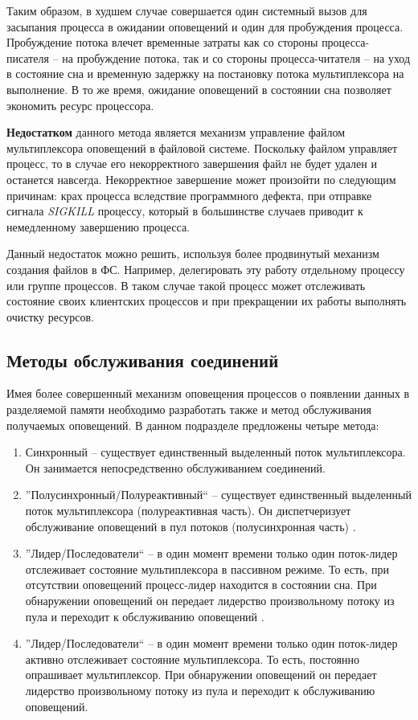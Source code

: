Таким образом, в худшем случае совершается один системный вызов для засыпания процесса в ожидании оповещений и один для пробуждения процесса. Пробуждение потока влечет временные затраты как со стороны процесса-писателя -- на пробуждение потока, так и со стороны процесса-читателя -- на уход в состояние сна и временную задержку на постановку потока мультиплексора на выполнение. В то же время, ожидание оповещений в состоянии сна позволяет экономить ресурс процессора.

\textbf{Недостатком} данного метода является механизм управление файлом мультиплексора оповещений в файловой системе. Поскольку файлом управляет процесс, то в случае его некорректного завершения файл не будет удален и останется навсегда. Некорректное завершение может произойти по следующим причинам: крах процесса вследствие программного дефекта, при отправке сигнала \textit{SIGKILL} процессу, который в большинстве случаев приводит к немедленному завершению процесса.

Данный недостаток можно решить, используя более продвинутый механизм создания файлов в ФС. Например, делегировать эту работу отдельному процессу или группе процессов. В таком случае такой процесс может отслеживать состояние своих клиентских процессов и при прекращении их работы выполнять очистку ресурсов.

\subsection{Методы обслуживания соединений}

Имея более совершенный механизм оповещения процессов о появлении данных в разделяемой памяти необходимо разработать также и метод обслуживания получаемых оповещений. В данном подразделе предложены четыре метода:
\begin{enumerate}
\item Синхронный -- существует единственный выделенный поток мультиплексора. Он занимается непосредственно обслуживанием соединений.
\item ''Полусинхронный/Полуреактивный`` -- существует единственный выделенный поток мультиплексора (полуреактивная часть). Он диспетчеризует обслуживание оповещений в пул потоков (полусинхронная часть) \cite{schmidt1995half}.
\item ''Лидер/Последователи`` -- в один момент времени только один поток-лидер отслеживает состояние мультиплексора в пассивном режиме. То есть, при отсутствии оповещений процесс-лидер находится в состоянии сна. При обнаружении оповещений он передает лидерство произвольному потоку из пула и переходит к обслуживанию оповещений \cite{schmidt1998leader}.
\item ''Лидер/Последователи`` -- в один момент времени только один поток-лидер активно отслеживает состояние мультиплексора. То есть, постоянно опрашивает мультиплексор. При обнаружении оповещений он передает лидерство произвольному потоку из пула и переходит к обслуживанию оповещений.
\end{enumerate}

